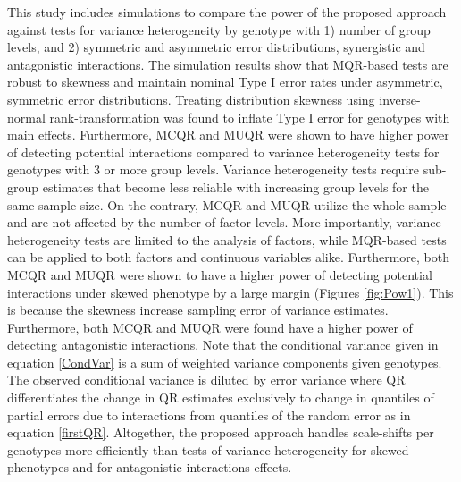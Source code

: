 \documentclass[12pt]{article}
\begin{document}
This study includes simulations to compare the power of the proposed approach against tests for variance heterogeneity by genotype with 1) number of group levels, and 2) symmetric and asymmetric error distributions,  synergistic and antagonistic interactions. The simulation results show that MQR-based tests are robust to skewness and maintain nominal Type I error rates under asymmetric, symmetric error distributions. Treating distribution skewness using inverse-normal rank-transformation was found to inflate Type I error for genotypes with main effects. Furthermore, MCQR and MUQR were shown to have higher power of detecting potential interactions compared to variance heterogeneity tests for genotypes with 3 or more group levels. Variance heterogeneity tests require sub-group estimates that become less reliable with increasing group levels for the same sample size. On the contrary, MCQR and MUQR utilize the whole sample and are not affected by the number of factor levels. More importantly, variance heterogeneity tests are limited to the analysis of factors, while MQR-based tests can be applied to both factors and continuous variables alike. Furthermore, both MCQR and MUQR were shown to have a higher power of detecting potential interactions under skewed phenotype by a large margin (Figures \ref{fig:Pow1}). This is because the skewness increase sampling error of variance estimates. Furthermore, both MCQR and MUQR were found have a higher power of detecting antagonistic interactions. Note that the conditional variance given in equation \ref{CondVar} is a sum of weighted variance components given genotypes. The observed conditional variance is diluted by error variance where QR differentiates the change in QR estimates exclusively to change in quantiles of partial errors due to interactions from quantiles of the random error as in equation \ref{firstQR}. Altogether, the proposed approach handles scale-shifts per genotypes more efficiently than tests of variance heterogeneity for skewed phenotypes and for antagonistic interactions effects. 
\end{document}
